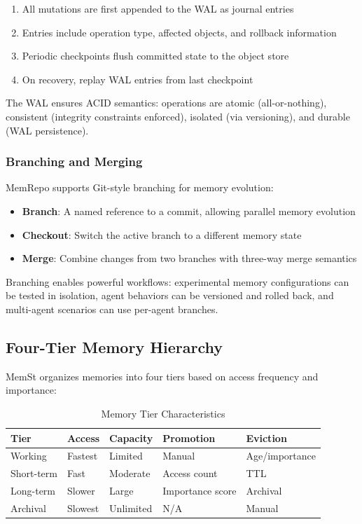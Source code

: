 \begin{enumerate}
    \item All mutations are first appended to the WAL as journal entries
    \item Entries include operation type, affected objects, and rollback information
    \item Periodic checkpoints flush committed state to the object store
    \item On recovery, replay WAL entries from last checkpoint
\end{enumerate}

The WAL ensures ACID semantics: operations are atomic (all-or-nothing), consistent (integrity constraints enforced), isolated (via versioning), and durable (WAL persistence).

\subsubsection{Branching and Merging}

MemRepo supports Git-style branching for memory evolution:

\begin{itemize}
    \item \textbf{Branch}: A named reference to a commit, allowing parallel memory evolution
    \item \textbf{Checkout}: Switch the active branch to a different memory state
    \item \textbf{Merge}: Combine changes from two branches with three-way merge semantics
\end{itemize}

Branching enables powerful workflows: experimental memory configurations can be tested in isolation, agent behaviors can be versioned and rolled back, and multi-agent scenarios can use per-agent branches.

\subsection{Four-Tier Memory Hierarchy}

MemSt organizes memories into four tiers based on access frequency and importance:

\begin{table}[ht]
\centering
\caption{Memory Tier Characteristics}
\begin{tabular}{@{}lllll@{}}
\toprule
\textbf{Tier} & \textbf{Access} & \textbf{Capacity} & \textbf{Promotion} & \textbf{Eviction} \\
\midrule
Working & Fastest & Limited & Manual & Age/importance \\
Short-term & Fast & Moderate & Access count & TTL \\
Long-term & Slower & Large & Importance score & Archival \\
Archival & Slowest & Unlimited & N/A & Manual \\
\bottomrule
\end{tabular}
\label{tab:memory-tiers}
\end{table}

